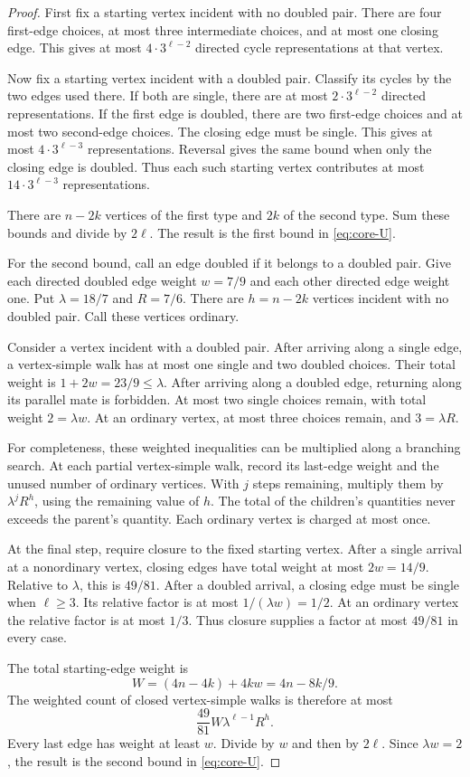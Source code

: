 \begin{proof}
First fix a starting vertex incident with no doubled pair.
There are four first-edge choices, at most three intermediate choices, and at most one closing edge.
This gives at most $4\cdot3^{\ell-2}$ directed cycle representations at that vertex.

Now fix a starting vertex incident with a doubled pair.
Classify its cycles by the two edges used there.
If both are single, there are at most $2\cdot3^{\ell-2}$ directed representations.
If the first edge is doubled, there are two first-edge choices and at most two second-edge choices.
The closing edge must be single.
This gives at most $4\cdot3^{\ell-3}$ representations.
Reversal gives the same bound when only the closing edge is doubled.
Thus each such starting vertex contributes at most $14\cdot3^{\ell-3}$ representations.

There are $n-2k$ vertices of the first type and $2k$ of the second type.
Sum these bounds and divide by $2\ell$.
The result is the first bound in \eqref{eq:core-U}.

For the second bound, call an edge doubled if it belongs to a doubled pair.
Give each directed doubled edge weight $w=7/9$ and each other directed edge weight one.
Put $\lambda=18/7$ and $R=7/6$.
There are $h=n-2k$ vertices incident with no doubled pair.
Call these vertices ordinary.

Consider a vertex incident with a doubled pair.
After arriving along a single edge, a vertex-simple walk has at most one single and two doubled choices.
Their total weight is $1+2w=23/9\le\lambda$.
After arriving along a doubled edge, returning along its parallel mate is forbidden.
At most two single choices remain, with total weight $2=\lambda w$.
At an ordinary vertex, at most three choices remain, and $3=\lambda R$.

For completeness, these weighted inequalities can be multiplied along a branching search.
At each partial vertex-simple walk, record its last-edge weight and the unused number of ordinary vertices.
With $j$ steps remaining, multiply them by $\lambda^jR^h$, using the remaining value of $h$.
The total of the children's quantities never exceeds the parent's quantity.
Each ordinary vertex is charged at most once.

At the final step, require closure to the fixed starting vertex.
After a single arrival at a nonordinary vertex, closing edges have total weight at most $2w=14/9$.
Relative to $\lambda$, this is $49/81$.
After a doubled arrival, a closing edge must be single when $\ell\ge3$.
Its relative factor is at most $1/(\lambda w)=1/2$.
At an ordinary vertex the relative factor is at most $1/3$.
Thus closure supplies a factor at most $49/81$ in every case.

The total starting-edge weight is
\[
 W=(4n-4k)+4kw=4n-8k/9.
\]
The weighted count of closed vertex-simple walks is therefore at most
\[
 \frac{49}{81}W\lambda^{\ell-1}R^h.
\]
Every last edge has weight at least $w$.
Divide by $w$ and then by $2\ell$.
Since $\lambda w=2$, the result is the second bound in \eqref{eq:core-U}.
\end{proof}

